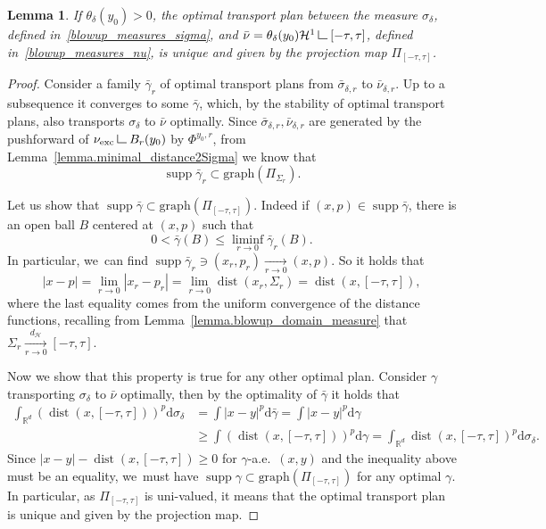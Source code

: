 \documentclass[10pt]{amsart}
\newtheorem{lemma}[theorem]{Lemma}
\theoremstyle{definition}
\newcommand\LM[1]{\hbox{\vrule width.5pt \vbox to#1pt{\vfill \hrule width#1pt height.5pt}}}
\newcommand\LL{{\mathchoice {\>\LM7\>}{\>\LM7\>}{\,\LM5\,}{\,\LM{3.35}\,}}}
\newcommand{\mres}{\LL}
\newcommand\cH{\mathcal{H}}
\newcommand{\RR}{\mathbb{R}}
\DeclareMathOperator{\dist}{dist}
\DeclareMathOperator{\supp}{supp}
\newcommand{\distH}{d_{\mathcal{H}}}
\newcommand{\nuexc}{\nu_{\textup{exc}}}
\newcommand\dd{\mathrm{d}}
\begin{document}
\begin{lemma}\label{lemma.brenier_map_blowup_family}
If $\theta_\delta(y_0)>0$, the optimal transport plan between the measure $\sigma_{\delta}$, defined in~\eqref{blowup_measures_sigma}, and $\bar \nu = \theta_\delta(y_0)\cH^1\mres [-\tau, \tau]$, defined in~\eqref{blowup_measures_nu}, is unique and given by the projection map $\Pi_{[-\tau, \tau]}$.
\end{lemma}

\begin{proof}
Consider a family $\bar \gamma_r$ of optimal transport plans from $\bar \sigma_{\delta , r}$ to $\bar \nu_{\delta ,r}$. Up to a subsequence it converges to some $\bar \gamma$, which, by the stability of optimal transport plans, also transports $\sigma_{\delta}$ to $\bar \nu$ optimally. Since $\bar \sigma_{\delta , r}, \bar \nu_{\delta ,r}$ are generated by the pushforward of $\nuexc\mres B_r(y_0)$ by $\Phi^{y_0, r}$, from Lemma~\ref{lemma.minimal_distance2Sigma} we know that
\[
\supp \bar \gamma_r \subset \text{graph}(\Pi_{\Sigma_r}).
\]

Let us show that $\supp \bar \gamma \subset \text{graph}\left(\Pi_{[-\tau, \tau]}\right)$. Indeed if $(x,p) \in \supp \bar \gamma$, there is an open ball $B$ centered at $(x,p)$ such that
\[
0 < \bar \gamma(B) \le \liminf_{r \to 0} \bar\gamma_r(B).
\]
In particular, we~can find $\supp \bar \gamma_r \ni (x_r, p_r) \xrightarrow[r \to 0]{} (x,p)$. So it holds that
\[
|x - p|
=
\lim_{r \to 0}
|x_r - p_r|
=
\lim_{r \to 0}
\dist\left(x_r, \Sigma_r\right)
=
\dist(x, [-\tau, \tau]),
\]
where the last equality comes from the uniform convergence of the distance functions, recalling from Lemma~\ref{lemma.blowup_domain_measure} that $\Sigma_r \xrightarrow[r \to 0]{\distH} [-\tau, \tau]$.

Now we show that this property is true for any other optimal plan. Consider $\gamma$ transporting $\sigma_{\delta}$ to $\bar \nu$ optimally, then by the optimality of $\bar \gamma$ it holds that
\begin{align*}
\int_{\RR^d} (\dist(x, [-\tau, \tau]))^p\dd \sigma_{\delta}
&=
\int |x - y|^p\dd \bar\gamma
= \int |x - y|^p\dd \gamma\\
&\ge
\int (\dist(x, [-\tau, \tau]))^p \dd \gamma
=
\int_{\RR^d} \dist(x, [-\tau, \tau])^p\dd \sigma_{\delta}.
\end{align*}
Since $|x - y| - \dist(x,[-\tau, \tau]) \ge 0 $ for $\gamma$-a.e.\ $(x,y)$ and the inequality above must be an equality, we~must have $\supp \gamma \subset \text{graph}\left(\Pi_{[-\tau, \tau]}\right)$ for any optimal $\gamma$. In particular, as $\Pi_{[-\tau, \tau]}$ is uni-valued, it means that the optimal transport plan is unique and given by the projection map.
\end{proof}
\end{document}
